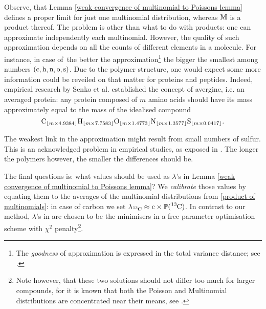 Observe, that Lemma \ref{weak convergence of multinomial to Poissons lemma} defines a proper limit for just one multinomial distribution, whereas $\mathbb{M}$ is a product thereof. The problem is other than what to do with products: one can approximate independently each multinomial. However, the quality of such approximation depends on all the counts of different elements in a molecule. For instance, in case of \molecule\,the better the approximation\footnote{The {\it goodness} of approximation is expressed in the total variance distance; see \cite{Roos1999OnTheRateOfMultivariatePoissonConvergence}.} the bigger the smallest among numbers $(\cem{c}, \cem{h}, \cem{n}, \cem{o}, \cem{s})$. Due to the polymer structure, one would expect some more information could be reveiled on that matter for proteins and peptides. Indeed, empirical research by Senko et al. \cite{Senko1995Determination} established the concept of avergine, i.e. an averaged protein: any protein composed of $m$ amino acids should have its mass approximately equal to the mass of the idealised compound 
\begin{equation*}
	\cem{C}_{\lfloor m \times 4.9384\rfloor} 
	\cem{H}_{\lfloor m \times 7.7583\rfloor} 
	\cem{O}_{\lfloor m \times 1.4773\rfloor} 	
	\cem{N}_{\lfloor m \times 1.3577\rfloor} 
	\cem{S}_{\lfloor m \times 0.0417\rfloor}.
\end{equation*}

The weakest link in the approximation might result from small numbers of sulfur. This is an acknowledged problem in empirical studies, as exposed in \cite{Valkenborg2007UsingPoisson}. The longer the polymers however, the smaller the differences should be. 


The final questions is: what values should be used as $\lambda$'s in Lemma \ref{weak convergence of multinomial to Poissons lemma}? We {\it calibrate} those values by equating them to the averages of the multinomial distributions from \eqref{product of multinomials}: in case of carbon we set $\lambda_\cem{^{13}C} \approx \cem{c} \times \prob( \cem{^{13}C} )$.  In contrast to our method, $\lambda$'s in \cite{Breen2000AutomaticPeak,Valkenborg2007UsingPoisson} are chosen to be the minimisers in a free parameter optimisation scheme with $\chi^2$ penalty\footnote{Note however, that these two solutions should not differ too much for larger compounds, for it is known that both the Poisson and Multinomial distributions are concentrated near their means, see \cite{Bobkov1998OnModifiedLogarithmicSobolev}.}. 


